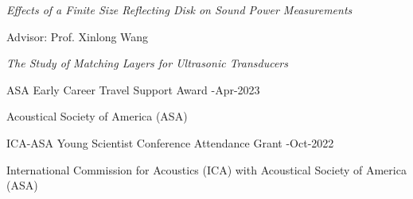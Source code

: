 \documentclass[10pt,a4paper,ragged2e,withhyper]{altacv}
\begin{document}
\faBook \textit{Effects of a Finite Size Reflecting Disk on Sound Power Measurements}

\divider


\faUserTie Advisor: Prof. Xinlong Wang\href{https://orcid.org/0000-0002-8137-1692}{\color{accent}\faOrcid}

\faBook \textit{The Study of Matching Layers for Ultrasonic Transducers}


\medskip
















{\color{accent}ASA Early Career Travel Support Award}  %
\hfill {}-Apr-2023
\par
Acoustical Society of America (ASA)

\divider

{\color{accent}ICA-ASA Young Scientist Conference Attendance Grant} 
\hfill {}-Oct-2022
\par
International Commission for
Acoustics (ICA) with Acoustical Society of America (ASA)
\end{document}
